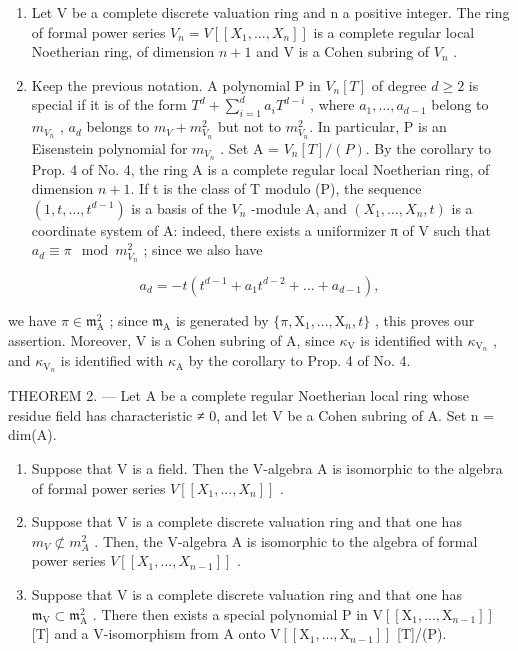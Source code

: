 \begin{enumerate}
\def\labelenumi{\arabic{enumi})}
\setcounter{enumi}{1}
\item
  Let V be a complete discrete valuation ring and n a positive integer. The ring of formal power series \(V_{n} = V[[X_{1}, ..., X_{n}]]\) is a complete regular local Noetherian ring, of dimension \(n + 1\) and V is a Cohen subring of \(V_{n}\) .
\item
  Keep the previous notation. A polynomial P in \(V_{n}[T]\) of degree \(d \geqslant 2\) is special if it is of the form \(T^{d} + \sum_{i=1}^{d} a_{i} T^{d-i}\) , where \(a_{1}, \ldots, a_{d-1}\) belong to \(m_{V_{n}}\) , \(a_{d}\) belongs to \(m_{V} + m_{V_{n}}^{2}\) but not to \(m_{V_{n}}^{2}\). In particular, P is an Eisenstein polynomial for \(m_{V_{n}}\) . Set A = \(V_{n}[T]/(P)\). By the corollary to Prop. 4 of No. 4, the ring A is a complete regular local Noetherian ring, of dimension \(n + 1\). If t is the class of T modulo (P), the sequence \((1, t, \ldots, t^{d-1})\) is a basis of the \(V_{n}\) -module A, and \((X_{1}, \ldots, X_{n}, t)\) is a coordinate system of A: indeed, there exists a uniformizer π of V such that \(a_{d} \equiv \pi \mod m_{V_{n}}^{2}\) ; since we also have
\end{enumerate}

\[
a _ {d} = - t \left(t ^ {d - 1} + a _ {1} t ^ {d - 2} + \dots + a _ {d - 1}\right),
\]

we have \(\pi\in\mathfrak{m}_{\mathrm{A}}^{2}\) ; since \(\mathfrak{m}_{\mathrm{A}}\) is generated by \(\{\pi,\mathrm{X}_{1},..., \mathrm{X}_{n},t\}\) , this proves our assertion. Moreover, V is a Cohen subring of A, since \(\kappa_{\mathrm{V}}\) is identified with \(\kappa_{\mathrm{V}_{n}}\) , and \(\kappa_{\mathrm{V}_{n}}\) is identified with \(\kappa_{\mathrm{A}}\) by the corollary to Prop. 4 of No. 4.

THEOREM 2. --- Let A be a complete regular Noetherian local ring whose residue field has characteristic ≠ 0, and let V be a Cohen subring of A. Set n = dim(A).

\begin{enumerate}
\def\labelenumi{\alph{enumi})}
\item
  Suppose that V is a field. Then the V-algebra A is isomorphic to the algebra of formal power series \(V[[X_{1}, ..., X_{n}]]\) .
\item
  Suppose that V is a complete discrete valuation ring and that one has \(m_{V} \not\subset m_{A}^{2}\) . Then, the V-algebra A is isomorphic to the algebra of formal power series \(V[[X_{1}, ..., X_{n-1}]]\) .
\item
  Suppose that V is a complete discrete valuation ring and that one has \(\mathfrak{m}_{\mathrm{V}} \subset \mathfrak{m}_{\mathrm{A}}^{2}\) . There then exists a special polynomial P in \(\mathrm{V}[[\mathrm{X}_{1}, ..., \mathrm{X}_{n-1}]]\) {[}T{]} and a V-isomorphism from A onto \(\mathrm{V}[[\mathrm{X}_{1}, ..., \mathrm{X}_{n-1}]]\) {[}T{]}/(P).
\end{enumerate}

